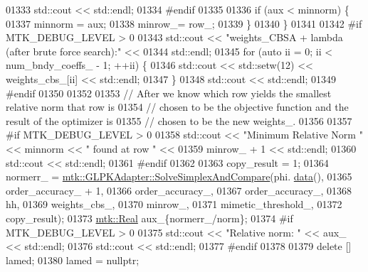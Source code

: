 \begin{DoxyCode}
{{01333       std::cout << std::endl;
01334 \textcolor{preprocessor}{      #endif}
01335 
01336       \textcolor{keywordflow}{if} (aux < minnorm) \{
01337         minnorm = aux;
01338         minrow\_= row\_;
01339       \}
01340     \}
01341 
01342 \textcolor{preprocessor}{    #if MTK\_DEBUG\_LEVEL > 0}
01343     std::cout << \textcolor{stringliteral}{"weights\_CBSA + lambda (after brute force search):"} <<
01344       std::endl;
01345     \textcolor{keywordflow}{for} (\textcolor{keyword}{auto} ii = 0; ii < num\_bndy\_coeffs\_ - 1; ++ii) \{
01346       std::cout << std::setw(12) << weights\_cbs\_[ii] << std::endl;
01347     \}
01348     std::cout << std::endl;
01349 \textcolor{preprocessor}{    #endif}
01350 
01352 
01353     \textcolor{comment}{// After we know which row yields the smallest relative norm that row is}
01354     \textcolor{comment}{// chosen to be the objective function and the result of the optimizer is}
01355     \textcolor{comment}{// chosen to be the new weights\_.}
01356 
01357 \textcolor{preprocessor}{    #if MTK\_DEBUG\_LEVEL > 0}
01358     std::cout << \textcolor{stringliteral}{"Minimum Relative Norm "} << minnorm << \textcolor{stringliteral}{" found at row "} <<
01359       minrow\_ + 1 << std::endl;
01360     std::cout << std::endl;
01361 \textcolor{preprocessor}{    #endif}
01362 
01363     copy\_result = 1;
01364     normerr\_ = \hyperlink{classmtk_1_1GLPKAdapter_a834480aca83e3c0d09fdab7fdb7e8a3f}{mtk::GLPKAdapter::SolveSimplexAndCompare}(phi.
      \hyperlink{classmtk_1_1DenseMatrix_a0c33b8a9e01d157c61ddbdf807c25d84}{data}(),
01365                                                         order\_accuracy\_ + 1,
01366                                                         order\_accuracy\_,
01367                                                         order\_accuracy\_,
01368                                                         hh,
01369                                                         weights\_cbs\_,
01370                                                         minrow\_,
01371                                                         mimetic\_threshold\_,
01372                                                         copy\_result);
01373     \hyperlink{group__c01-roots_gac080bbbf5cbb5502c9f00405f894857d}{mtk::Real} aux\_\{normerr\_/norm\};
01374 \textcolor{preprocessor}{    #if MTK\_DEBUG\_LEVEL > 0}
01375     std::cout << \textcolor{stringliteral}{"Relative norm: "} << aux\_ << std::endl;
01376     std::cout << std::endl;
01377 \textcolor{preprocessor}{    #endif}
01378 
01379     \textcolor{keyword}{delete} [] lamed;
01380     lamed = \textcolor{keyword}{nullptr};
}}
\end{DoxyCode}
